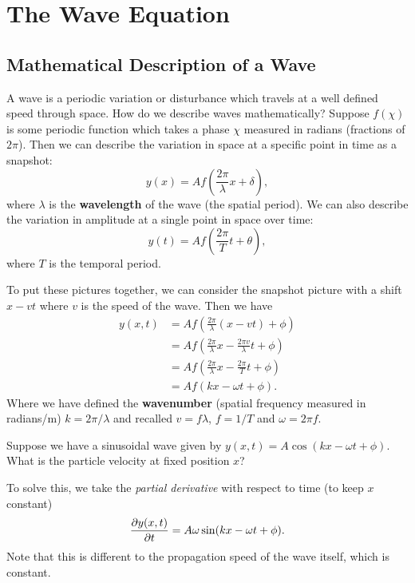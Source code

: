 \documentclass[../classical_mechanics.tex]{subfiles}
\begin{document}
    \section{The Wave Equation}\label{sec:the-wave-equation}
        \subsection{Mathematical Description of a Wave}\label{subsec:mathematical-description-of-a-wave}
            A wave is a periodic variation or disturbance which travels at a well defined speed through space.
            How do we describe waves mathematically?
            Suppose $f(\chi)$ is some periodic function which takes a phase $\chi$ measured in radians (fractions of $2\pi$).
            Then we can describe the variation in space at a specific point in time as a snapshot:
            \begin{equation}
                y(x)=Af\left(\frac{2\pi}{\lambda}x+\delta\right),
            \end{equation}
            where $\lambda$ is the \textbf{wavelength} of the wave (the spatial period).
            We can also describe the variation in amplitude at a single point in space over time:
            \begin{equation}
                y(t)=Af\left(\frac{2\pi}{T}t+\theta\right),
            \end{equation}
            where $T$ is the temporal period.

            To put these pictures together, we can consider the snapshot picture with a shift $x-vt$ where $v$ is the speed of the wave.
            Then we have
            \begin{align}
                y(x,t)&=Af\left(\frac{2\pi}{\lambda}(x-vt)+\phi\right)\\
                &=Af\left(\frac{2\pi}{\lambda}x-\frac{2\pi v}{\lambda}t+\phi\right)\\
                &=Af\left(\frac{2\pi}{\lambda}x-\frac{2\pi}{T}t+\phi\right)\\
                &=Af(kx-\omega t+\phi).
            \end{align} 
            Where we have defined the \textbf{wavenumber} (spatial frequency measured in radians/m) $k=2\pi/\lambda$ and recalled $v=f\lambda$, $f=1/T$ and $\omega=2\pi f$.
            \begin{example}
                Suppose we have a sinusoidal wave given by $y(x,t)=A\cos(kx-\omega t+\phi)$.
                What is the particle velocity at fixed position $x$?

                To solve this, we take the \textit{partial derivative} with respect to time (to keep $x$ constant)
                \begin{equation}
                    \pdv{y(x,t)}{t}=A\omega\sin(kx-\omega t+\phi).
                \end{equation}
                Note that this is different to the propagation speed of the wave itself, which is constant.
            \end{example}
\end{document}
